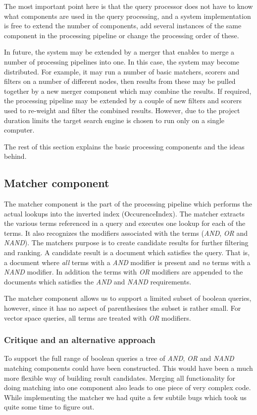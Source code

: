 The most important point here is that the query processor does not have to know what components are used in the query processing, and a system implementation is free to extend the number of components, add several instances of the same component in the processing pipeline or change the processing order of these. 

In future, the system may be extended by a merger that enables to merge a number of processing pipelines into one. In this case, the system may become distributed. For example, it may run a number of basic matchers, scorers and filters on a number of different nodes, then results from these may be pulled together by a new merger component which may combine the results. If required, the processing pipeline may be extended by a couple of new filters and scorers used to re-weight and filter the combined results. However, due to the project duration limits the target search engine is chosen to run only on a single computer.

The rest of this section explains the basic processing components and the ideas behind.

\subsection{Matcher component}
The matcher component is the part of the processing pipeline which performs the actual lookups into the inverted index (OccurenceIndex). The matcher extracts the various terms referenced in a query and executes one lookup for each of the terms. It also recognizes the modifiers associated with the terms (\emph{AND}, \emph{OR} and \emph{NAND}). The matchers purpose is to create candidate results for further filtering and ranking. A candidate result is a document which satisfies the query. That is, a document where \emph{all} terms with a \emph{AND} modifier is present and \emph{no} terms with a \emph{NAND} modifier. In addition the terms with \emph{OR} modifiers are appended to the documents which satisfies the \emph{AND} and \emph{NAND} requirements.

The matcher component allows us to support a limited subset of boolean queries, however, since it has no aspect of parenthesises the subset is rather small. For vector space queries, all terms are treated with \emph{OR} modifiers.

\subsubsection{Critique and an alternative approach}\label{sssub:matcher_critique}
To support the full range of boolean queries a tree of \emph{AND}, \emph{OR} and \emph{NAND} matching components could have been constructed. This would have been a much more flexible way of building result candidates. Merging all functionality for doing matching into one component  also leads to one piece of very complex code. While implementing the matcher we had quite a few subtile bugs which took us quite some time to figure out. 

